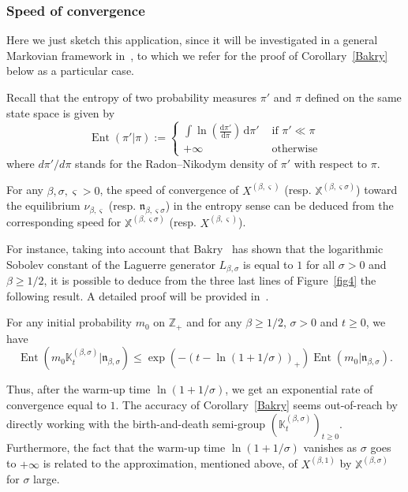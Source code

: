 \documentclass[10pt]{amsart}
\theoremstyle{definition}\newtheorem{defi}[theo]{Definition}\newtheorem{rema}[theo]{Remark}\newtheorem{exam}[theo]{Example}\newtheorem{exem}[theo]{Example}\newtheorem{nota}[theo]{Notation}
\DeclareMathOperator{\Ent}{Ent}
\newcommand{\df}{\mathrel{:=}}
\newcommand{\ZZ}{\mathbb{Z}}
\newcommand{\fn}{\mathfrak{n}}
\newcommand{\fX}{\mathbb{X}}
\newcommand{\iy}{\infty}
\newcommand{\lt}{\left}
\newcommand{\rt}{\right}
\newcommand{\Lg}{L}
\newcommand{\dLs}{{\discret{K}}}
\newcommand{\discret}[1]{\mathds{#1}}
\newcommand*{\dd}{\mathrm{d}}
\begin{document}
\subsubsection*{Speed of convergence}
Here we just sketch this application, since it will be investigated in a general Markovian framework in~\cite{intertwining}, to which we refer for the proof of Corollary~\ref{Bakry} below as a particular case.

Recall that the entropy of two probability measures $\pi'$ and $\pi$ defined on the same state space is given by
\[
\Ent(\pi'\vert\pi)\df
\begin{cases}
\int \ln\lt(\frac{\dd\pi'}{\dd\pi}\rt)\, \dd\pi'&\text{ if $\pi'\ll\pi$}\\
+\iy&\text{ otherwise}
\end{cases}
\]
where $d\pi'/d\pi$ stands for the Radon--Nikodym density of $\pi'$ with respect to $\pi$.

For any $\beta,\sigma,\varsigma>0$, the speed of convergence of $X^{(\beta,\varsigma)}$ (resp. $\fX^{(\beta,\varsigma\sigma)}$) toward the equilibrium $\nu_{\beta,\varsigma}$ (resp. $\fn_{\beta,\varsigma\sigma}$) in the entropy sense can be deduced from the corresponding speed for $\fX^{(\beta,\varsigma\sigma)}$ (resp. $X^{(\beta,\varsigma)}$).

For instance, taking into account that Bakry~\cite{MR1417973} has shown that the logarithmic Sobolev constant of the Laguerre generator $\Lg_{\beta,\sigma}$ is equal to $1$ for all $\sigma >0$ and $\beta\geq 1/2$, it is possible to deduce from the three last lines of Figure~\ref{fig4} the following result. A detailed proof will be provided in~\cite{intertwining}.

\begin{coro}\label{Bakry}
For any initial probability $m_0$ on $\ZZ_+$ and for any $\beta\geq 1/2$, $\sigma>0$ and $t\geq 0$, we have
\[
\Ent(m_0\dLs_t^{(\beta,\sigma)}\vert\fn_{\beta,\sigma})\leq \exp(-(t-\ln(1+1/\sigma))_+)\Ent(m_0\vert\fn_{\beta,\sigma}).
\]
\end{coro}


Thus, after the warm-up time $\ln(1+1/\sigma)$, we get an exponential rate of convergence equal to $1$. The accuracy of Corollary~\ref{Bakry} seems out-of-reach by directly working with the birth-and-death semi-group $(\dLs_t^{(\beta,\sigma)})_{t\geq 0}$. Furthermore, the fact that the warm-up time $\ln(1+1/\sigma)$ vanishes as $\sigma$ goes to $+\iy$ is related to the approximation, mentioned above, of $X^{(\beta,1)}$ by $\fX^{(\beta,\sigma)}$ for $\sigma$ large.
\end{document}
